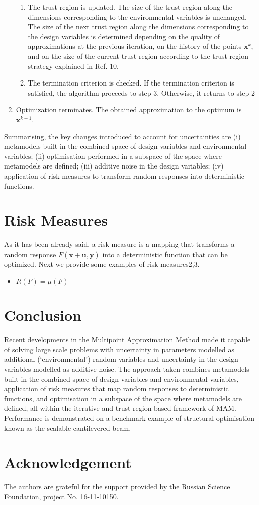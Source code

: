 \documentclass[10pt,twocolumn,a4paper]{article}
\begin{document}
\begin{enumerate}
\begin{enumerate}[label=(\alph*)]
    \item The trust region is updated. The size of the trust region along the dimensions corresponding to the environmental variables is unchanged. The size of the next trust region along the dimensions corresponding to the design variables is determined depending on the quality of approximations at the previous iteration, on the history of the points $\pmb x^k$, and on the size of the current trust region according to the trust region strategy explained in Ref. 10.
    \item The termination criterion is checked. If the termination criterion is satisfied, the algorithm proceeds to step 3. Otherwise, it returns to step 2
  \end{enumerate}
  \item Optimization terminates. The obtained approximation to the optimum is $\pmb x^{k+1}$.
\end{enumerate}

Summarising, the key changes introduced to account for uncertainties are (i) metamodels built in the combined space of design variables and environmental variables; (ii) optimisation performed in a subspace of the space where metamodels are defined; (iii) additive noise in the design variables; (iv) application of risk measures to transform random responses into deterministic functions.

\section{Risk Measures}
\label{sec:risk}

As it has been already said, a risk measure is a mapping that transforms a random response $F(\pmb x+ \pmb u,\pmb y)$  into a deterministic function that can be optimized. Next we provide some examples of risk measures2,3.

\begin{itemize}
  \item $R(F)=\mu(F)$
\end{itemize}

\section{Conclusion}

Recent developments in the Multipoint Approximation Method made it capable of solving large scale problems with uncertainty in parameters modelled as additional (‘environmental’) random variables and uncertainty in the design variables modelled as additive noise. The approach taken combines metamodels built in the combined space of design variables and environmental variables, application of risk measures that map random responses to deterministic functions, and optimisation in a subspace of the space where metamodels are defined, all within the iterative and trust-region-based framework of MAM. Performance is demonstrated on a benchmark example of structural optimisation known as the scalable cantilevered beam.

\section*{Acknowledgement}
The authors are grateful for the support provided by the Russian Science Foundation, project No. 16-11-10150.

{}

\end{document}
